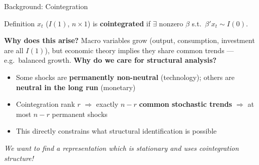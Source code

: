 \documentclass[aspectratio=169,11pt]{beamer}
\begin{document}
\begin{frame}{Background: Cointegration}
    \begin{block}{Definition}
        $x_t$ ($I(1)$, $n\times1$) is \textbf{cointegrated} if $\exists$ nonzero $\beta$ s.t.\ $\beta'x_t \sim I(0)$.
    \end{block}
    \pause
    \vspace{0.4em}
    \textbf{Why does this arise?} Macro variables grow (output, consumption, investment are all $I(1)$), but economic theory implies they share common trends --- e.g.\ balanced growth.
    \pause
    \vspace{0.4em}
    \textbf{Why do we care for structural analysis?}
    \begin{itemize}
        \item Some shocks are \textbf{permanently non-neutral} (technology); others are \textbf{neutral in the long run} (monetary)
        \item Cointegration rank $r$ $\Rightarrow$ exactly $n - r$ \textbf{common stochastic trends} $\Rightarrow$ at most $n-r$ permanent shocks
        \item This directly constrains what structural identification is possible
    \end{itemize}
    \pause
    \emph{We want to find a representation which is stationary and uses cointegration structure!}
\end{frame}
\end{document}
